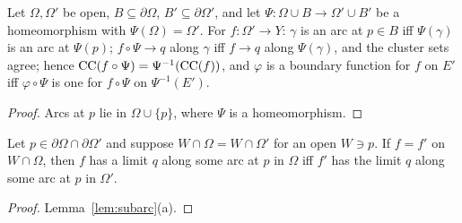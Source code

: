 \begin{lemma}[transfer]\label{lem:transfer}
Let $\Omega,\Omega'$ be open, $B\subseteq\partial\Omega$, $B'\subseteq\partial\Omega'$, and let
$\Psi:\Omega\cup B\to\Omega'\cup B'$ be a homeomorphism with $\Psi(\Omega)=\Omega'$. For $f:\Omega'\to Y$:
$\gamma$ is an arc at $p\in B$ iff $\Psi(\gamma)$ is an arc at $\Psi(p)$; $f\circ\Psi\to q$ along
$\gamma$ iff $f\to q$ along $\Psi(\gamma)$, and the cluster sets agree; hence
$\operatorname{CC}(f\circ\Psi)=\Psi^{-1}(\operatorname{CC}(f))$, and $\varphi$ is a boundary function for $f$ on $E'$ iff
$\varphi\circ\Psi$ is one for $f\circ\Psi$ on $\Psi^{-1}(E')$.
\end{lemma}
\begin{proof}
Arcs at $p$ lie in $\Omega\cup\{p\}$, where $\Psi$ is a homeomorphism.
\end{proof}

\begin{lemma}[locality]\label{lem:locality}
Let $p\in\partial\Omega\cap\partial\Omega'$ and suppose $W\cap\Omega=W\cap\Omega'$ for an open $W\ni p$. If
$f=f'$ on $W\cap\Omega$, then $f$ has a limit $q$ along some arc at $p$ in $\Omega$ iff $f'$ has the limit
$q$ along some arc at $p$ in $\Omega'$.
\end{lemma}
\begin{proof}
Lemma~\ref{lem:subarc}(a).
\end{proof}
